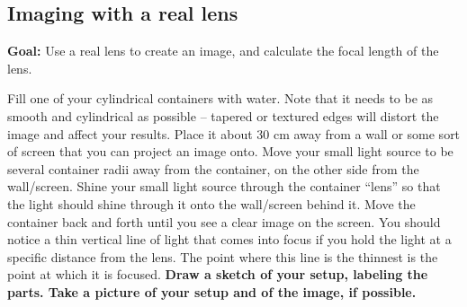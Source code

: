 \subsection{Imaging with a real lens}

\textbf{Goal:} Use a real lens to create an image, and calculate the focal length of the lens.

\begin{steps}

	\item Fill one of your cylindrical containers with water. Note that it needs to be as smooth and cylindrical as possible – tapered or textured edges will distort the image and affect your results. Place it about 30 cm away from a wall or some sort of screen that you can project an image onto. Move your small light source to be several container radii away from the container, on the other side from the wall/screen. Shine your small light source through the container “lens” so that the light should shine through it onto the wall/screen behind it. Move the container back and forth until you see a clear image on the screen. You should notice a thin vertical line of light that comes into focus if you hold the light at a specific distance from the lens. The point where this line is the thinnest is the point at which it is focused. \textbf{Draw a sketch of your setup, labeling the parts. Take a picture of your setup and of the image, if possible.}

	
\end{steps}


